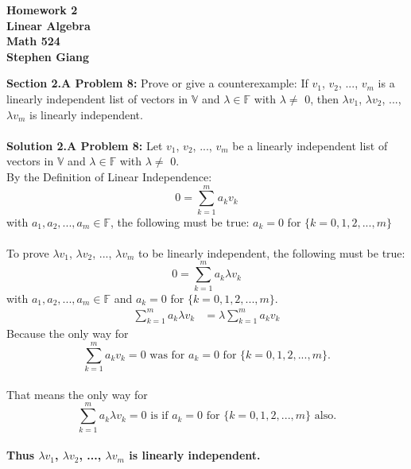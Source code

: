 \documentclass[12pt]{article}
\begin{document}
	
	\begin{center}
		\textbf{Homework 2} \\
		\textbf{Linear Algebra} \\
		\textbf{Math 524} \\
		\textbf{Stephen Giang} \\
	\end{center}

\noindent \textbf{Section 2.A Problem 8: } Prove or give a counterexample: If $v_1$, $v_2$, ..., $v_m$ is a linearly independent list of vectors in $\mathbb{V}$ and $\lambda \in \mathbb{F}$ with  $\lambda \not=$  0, then $\lambda v_1$, $\lambda v_2$, ...,  $\lambda v_m$ is linearly independent.
\\\\
\noindent \textbf{Solution 2.A Problem 8: } Let $v_1$, $v_2$, ..., $v_m$ be a linearly independent list of vectors in $\mathbb{V}$ and $\lambda \in \mathbb{F}$ with  $\lambda \not=$  0. 
\\
By the Definition of Linear Independence: $$ 0= \sum_{k=1}^{m} a_k v_k $$ with  $a_1,a_2,...,a_m \in \mathbb{F}$, the following must be true: $a_k = 0$ for $\{ k = 0,1,2,...,m\}$
\\\\
To prove $\lambda v_1$, $\lambda v_2$, ...,  $\lambda v_m$ to be linearly independent, the following must be true: $$ 0= \sum_{k=1}^{m} a_k \lambda v_k $$ with  $a_1,a_2,...,a_m \in \mathbb{F}$ and $a_k = 0$ for $\{ k = 0,1,2,...,m\}$.
	\begin{align}
		\sum_{k=1}^{m} a_k \lambda v_k &= \lambda \sum_{k=1}^{m} a_k v_k 		
	\end{align}
Because the only way for $$ \sum_{k=1}^{m} a_k v_k  = 0 \text{ was for } a_k = 0 \text{ for } \{ k = 0,1,2,...,m\}.$$ \\
That means the only way for $$ \sum_{k=1}^{m} a_k \lambda v_k  = 0 \text{ is if } a_k = 0 \text{ for } \{ k = 0,1,2,...,m\} \text{ also.}$$  \\
\textbf{Thus \boldmath $\lambda v_1$, $\lambda v_2$, ...,  $\lambda v_m$ is linearly independent.}


\newpage
\end{document}
